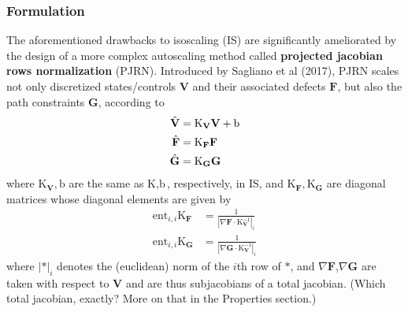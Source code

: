 \documentclass{article}
\begin{document}
\subsubsection*{Formulation}

The aforementioned drawbacks to isoscaling (IS) are significantly ameliorated by the design of a more complex autoscaling method called \textbf{projected jacobian rows normalization} (PJRN). Introduced by Sagliano et al (2017), PJRN scales not only discretized states/controls $\textbf{V}$ and their associated defects $\textbf{F}$, but also the path constraints $\textbf{G}$, according to
\begin{align*}
    \Hat{\textbf{V}} &= \text{K}_\textbf{V} \textbf{V} + \text{b} \\
    \Hat{\textbf{F}} &= \text{K}_\textbf{F} \textbf{F} \\
    \Hat{\textbf{G}} &= \text{K}_\textbf{G} \textbf{G}
\end{align*}
where $\text{K}_\textbf{V},\text{b}$ are the same as $\text{K},\text{b}$, respectively, in IS, and $\text{K}_\textbf{F},\text{K}_\textbf{G}$ are diagonal matrices whose diagonal elements are given by
\begin{align*}
    \text{ent}_{i,i} \text{K}_\textbf{F} &= \frac{1}{|\nabla \textbf{F} \cdot \text{K}_\textbf{V}^{-1}|_i} \\
    \text{ent}_{i,i} \text{K}_\textbf{G} &= \frac{1}{|\nabla \textbf{G} \cdot \text{K}_\textbf{V}^{-1}|_i}
\end{align*}
where $|*|_i$ denotes the (euclidean) norm of the $i$th row of $*$, and $\nabla \textbf{F}$,$\nabla \textbf{G}$ are taken with respect to $\textbf{V}$ and are thus subjacobians of a total jacobian. (Which total jacobian, exactly? More on that in the Properties section.) \\
\end{document}
